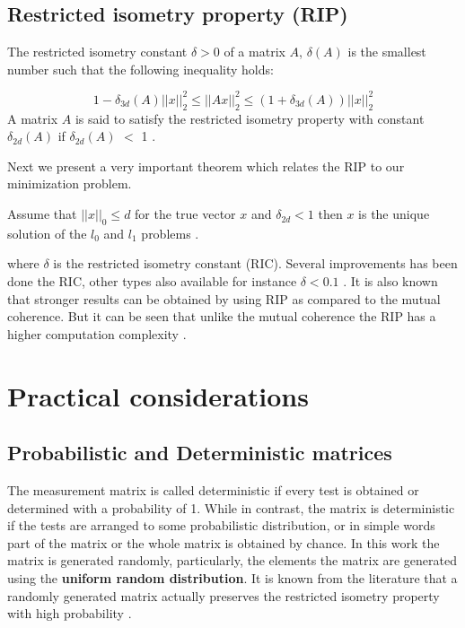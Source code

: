 \subsection{Restricted isometry property (RIP)}
The restricted isometry constant $ \delta > 0$ of a matrix $ A $, $ \delta (A) $ is the smallest number such that the following inequality holds: 

\begin{equation*}
1 - \delta_{3d}(A) ||x||_{2}^{2} \leq ||Ax||_{2}^{2} \leq (1+\delta_{3d}(A))||x||_{2}^{2}
\end{equation*} A matrix $ A $ is said to satisfy the restricted isometry property with constant $ \delta_{2d} (A) $ if $ \delta_{2d} (A) $ $<$ 1  \cite{RIP}. 

Next we present a very important theorem which relates the RIP to our minimization problem. %
\begin{theorem}
	Assume that $ ||x||_0 \leq d$ for the true vector $ x $ and $ \delta_{2d} < 1$ %
	 then $ x $ is the unique solution of the $ l_0 $ and $ l_1 $ problems \cite{radar}. 
\end{theorem} where $ \delta $ is the restricted isometry constant (RIC).  Several improvements has been done the RIC, other types also available for instance $ \delta < 0.1 $ \cite{bluemensath}. It is also known that stronger results can be obtained by using RIP as compared to the mutual coherence. But it can be seen that unlike the mutual coherence the RIP has a higher computation complexity  \cite{RIP}.    
\section{Practical considerations}
\subsection{Probabilistic and Deterministic matrices}
The measurement matrix is called deterministic if every test is obtained or determined with a probability of 1. While in contrast, the matrix is deterministic if the tests are arranged to some probabilistic distribution, or in simple words part of the matrix or the whole matrix is obtained by chance. In this work the matrix is generated randomly, particularly, the elements the matrix are generated using the \textbf{uniform random distribution}.  It is known from the literature that a randomly generated matrix actually preserves the restricted isometry property with high probability \cite{ripg}. 
